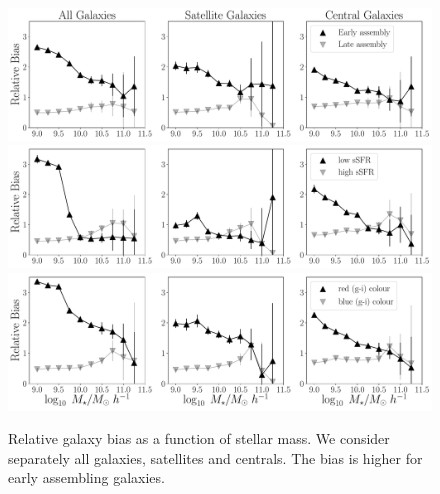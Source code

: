 \documentclass[fleqn,usenatbib]{mnras}
\begin{document}
\begin{figure}
    \centering
    \includegraphics[width=2.0\columnwidth]{figuras/bias_galaxies.pdf}
    \includegraphics[width=2.0\columnwidth]{figuras/ssfr_bias_galaxies.pdf}
    \includegraphics[width=2.0\columnwidth]{figuras/color_bias_galaxies.pdf}
    \caption{Relative galaxy bias as a function of stellar mass.
    We consider separately all galaxies, satellites and centrals.
    The bias is higher for early assembling galaxies.}
    \label{fig:galaxy_bias}
\end{figure}
\end{document}
